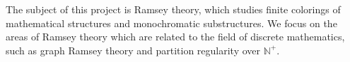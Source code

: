 The subject of this project is Ramsey theory, which studies finite colorings of mathematical structures and monochromatic substructures. We focus on the areas of Ramsey theory which are related to the field of discrete mathematics, such as graph Ramsey theory and partition regularity over $\mathbb{N}^{+}$.
